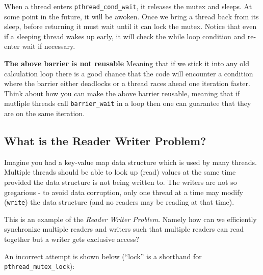 \begin{Shaded}
\begin{Highlighting}[]
 
 \NormalTok{\{}
\NormalTok{\}}
\end{Highlighting}
\end{Shaded}

When a thread enters \texttt{pthread\_cond\_wait}, it releases the mutex
and sleeps. At some point in the future, it will be awoken. Once we
bring a thread back from its sleep, before returning it must wait until
it can lock the mutex. Notice that even if a sleeping thread wakes up
early, it will check the while loop condition and re-enter wait if
necessary.

\textbf{The above barrier is not reusable} Meaning that if we stick it
into any old calculation loop there is a good chance that the code will
encounter a condition where the barrier either deadlocks or a thread
races ahead one iteration faster. Think about how you can make the above
barrier reusable, meaning that if mutliple threads call
\texttt{barrier\_wait} in a loop then one can guarantee that they are on
the same iteration.

\subsection{What is the Reader Writer
Problem?}\label{what-is-the-reader-writer-problem}

Imagine you had a key-value map data structure which is used by many
threads. Multiple threads should be able to look up (read) values at the
same time provided the data structure is not being written to. The
writers are not so gregarious - to avoid data corruption, only one
thread at a time may modify (\texttt{write}) the data structure (and no
readers may be reading at that time).

This is an example of the \emph{Reader Writer Problem}. Namely how can
we efficiently synchronize multiple readers and writers such that
multiple readers can read together but a writer gets exclusive access?

An incorrect attempt is shown below (``lock'' is a shorthand for
\texttt{pthread\_mutex\_lock}):

